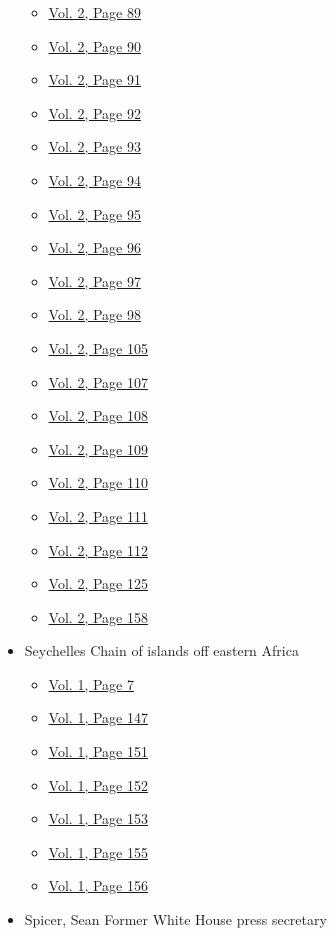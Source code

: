 \begin{itemize}
\begin{itemize}
  \item
    \protect\hyperlink{g-page-301}{Vol. 2, Page 89}
  \item
    \protect\hyperlink{g-page-302}{Vol. 2, Page 90}
  \item
    \protect\hyperlink{g-page-303}{Vol. 2, Page 91}
  \item
    \protect\hyperlink{g-page-304}{Vol. 2, Page 92}
  \item
    \protect\hyperlink{g-page-305}{Vol. 2, Page 93}
  \item
    \protect\hyperlink{g-page-306}{Vol. 2, Page 94}
  \item
    \protect\hyperlink{g-page-307}{Vol. 2, Page 95}
  \item
    \protect\hyperlink{g-page-308}{Vol. 2, Page 96}
  \item
    \protect\hyperlink{g-page-309}{Vol. 2, Page 97}
  \item
    \protect\hyperlink{g-page-310}{Vol. 2, Page 98}
  \item
    \protect\hyperlink{g-page-317}{Vol. 2, Page 105}
  \item
    \protect\hyperlink{g-page-319}{Vol. 2, Page 107}
  \item
    \protect\hyperlink{g-page-320}{Vol. 2, Page 108}
  \item
    \protect\hyperlink{g-page-321}{Vol. 2, Page 109}
  \item
    \protect\hyperlink{g-page-322}{Vol. 2, Page 110}
  \item
    \protect\hyperlink{g-page-323}{Vol. 2, Page 111}
  \item
    \protect\hyperlink{g-page-324}{Vol. 2, Page 112}
  \item
    \protect\hyperlink{g-page-337}{Vol. 2, Page 125}
  \item
    \protect\hyperlink{g-page-370}{Vol. 2, Page 158}
  \end{itemize}
\item
  Seychelles Chain of islands off eastern Africa

  \begin{itemize}
  \tightlist
  \item
    \protect\hyperlink{g-page-15}{Vol. 1, Page 7}
  \item
    \protect\hyperlink{g-page-155}{Vol. 1, Page 147}
  \item
    \protect\hyperlink{g-page-159}{Vol. 1, Page 151}
  \item
    \protect\hyperlink{g-page-160}{Vol. 1, Page 152}
  \item
    \protect\hyperlink{g-page-161}{Vol. 1, Page 153}
  \item
    \protect\hyperlink{g-page-163}{Vol. 1, Page 155}
  \item
    \protect\hyperlink{g-page-164}{Vol. 1, Page 156}
  \end{itemize}
\item
  Spicer, Sean Former White House press secretary


\end{itemize}
